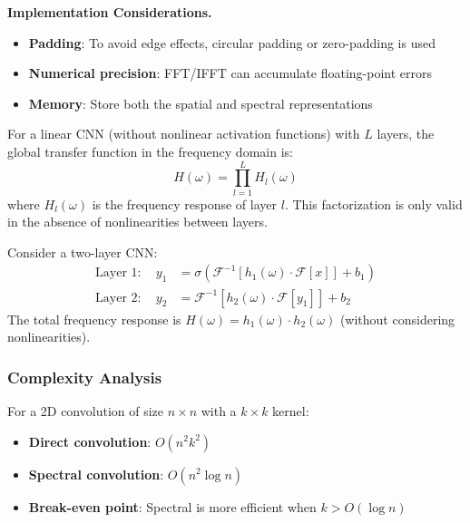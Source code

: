 \textbf{Implementation Considerations.}
\begin{itemize}
    \item \textbf{Padding}: To avoid edge effects, circular padding or zero-padding is used
    \item \textbf{Numerical precision}: \gls{FFT}/IFFT can accumulate floating-point errors
    \item \textbf{Memory}: Store both the spatial and spectral representations
\end{itemize}

\begin{definition}\label{def:funcion_transferencia_cnn}
For a linear CNN (without nonlinear activation functions) with $L$ layers, the global transfer function in the frequency domain is:
\begin{equation}
H(\omega) = \prod_{l=1}^L H_l(\omega)
\end{equation}
where $H_l(\omega)$ is the frequency response of layer $l$. This factorization is only valid in the absence of nonlinearities between layers.
\end{definition}

\begin{example}\label{ex:cnn_espectral_simple}
Consider a two-layer CNN:
\begin{align}
\text{Layer 1}: \quad y_1 &= \sigma(\mathcal{F}^{-1}[h_1(\omega) \cdot \mathcal{F}[x]] + b_1) \\
\text{Layer 2}: \quad y_2 &= \mathcal{F}^{-1}[h_2(\omega) \cdot \mathcal{F}[y_1]] + b_2
\end{align}
The total frequency response is $H(\omega) = h_1(\omega) \cdot h_2(\omega)$ (without considering nonlinearities).
\end{example}

\subsubsection{Complexity Analysis}

\begin{theorem}\label{thm:complejidad_convoluciones_espectrales}
For a 2D convolution of size $n \times n$ with a $k \times k$ kernel:
\begin{itemize}
    \item \textbf{Direct convolution}: $O(n^2 k^2)$
    \item \textbf{Spectral convolution}: $O(n^2 \log n)$
    \item \textbf{Break-even point}: Spectral is more efficient when $k > O(\log n)$
\end{itemize}
\end{theorem}

